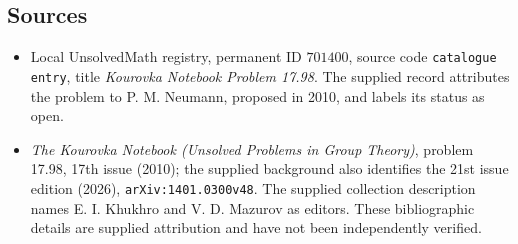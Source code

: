 \documentclass[11pt]{article}
\begin{document}
\subsection{Sources}
\begin{itemize}
\item Local UnsolvedMath registry, permanent ID \(701400\), source code \texttt{catalogue entry}, title \emph{Kourovka Notebook Problem 17.98}. The supplied record attributes the problem to P. M. Neumann, proposed in 2010, and labels its status as open.
\item \emph{The Kourovka Notebook (Unsolved Problems in Group Theory)}, problem 17.98, 17th issue (2010); the supplied background also identifies the 21st issue edition (2026), \texttt{arXiv:1401.0300v48}. The supplied collection description names E. I. Khukhro and V. D. Mazurov as editors. These bibliographic details are supplied attribution and have not been independently verified.
\end{itemize}
\end{document}
